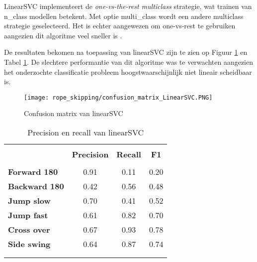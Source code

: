 LinearSVC implementeert de \textit{one-vs-the-rest multiclass} strategie, wat trainen van n\_class modellen betekent. Met optie multi\_class wordt een andere multiclass strategie geselecteerd. Het is echter aangewezen om one-vs-rest te gebruiken aangezien dit algoritme veel sneller is \cite{ref32} \cite{ref33} \cite{ref34}.

De resultaten bekomen na toepassing van linearSVC zijn te zien op Figuur \ref{fig:linearSVC} en Tabel \ref{tab:linearsvc_precision_recall}. De slechtere performantie van dit algoritme was te verwachten aangezien het onderzochte classificatie probleem hoogstwaarschijnlijk niet lineair scheidbaar is.

\begin{figure}[!htpd]
\centering
\caption{Confusion matrix van linearSVC}\label{fig:linearSVC}
\texttt{[image: rope\_skipping/confusion\_matrix\_LinearSVC.PNG]}  
\end{figure}

\begin{table}[!htpd]
  \centering
  \caption{Precision en recall van linearSVC}
  \label{tab:linearsvc_precision_recall}
\begin{tabular}{lccc}
 \hline \\
\textbf{}             & \textbf{Precision} & \textbf{Recall} & \textbf{F1} &  \\
\hline \\
\textbf{Forward 180}  & 0.91               & 0.11            & 0.20 & \\
\textbf{Backward 180} & 0.42               & 0.56            & 0.48 & \\
\textbf{Jump slow}    & 0.70               & 0.41            & 0.52 & \\
\textbf{Jump fast}    & 0.61               & 0.82            & 0.70 & \\
\textbf{Cross over}   & 0.67               & 0.93            & 0.78 & \\
\textbf{Side swing}   & 0.64               & 0.87            & 0.74 \\ \\
\hline \\
\end{tabular}
\end{table}

